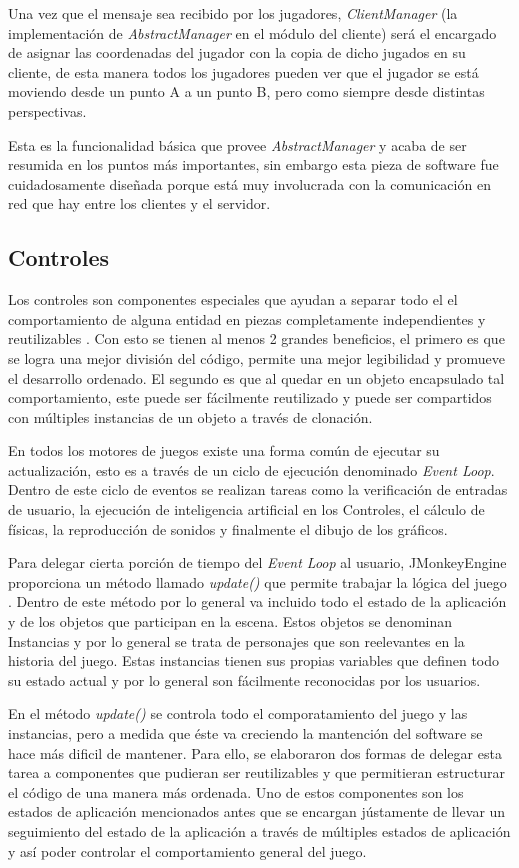 \documentclass[a4paper,12pt,openany,oneside]{book}
\begin{document}
Una vez que el mensaje sea recibido por los jugadores, \textit{ClientManager} (la implementación de \textit{AbstractManager} en el módulo del cliente) será el encargado de asignar las coordenadas del jugador con la copia de dicho jugados en su cliente, de esta manera todos los jugadores pueden ver que el jugador se está moviendo desde un punto A a un punto B, pero como siempre desde distintas perspectivas.

Esta es la funcionalidad básica que provee \textit{AbstractManager} y acaba de ser resumida en los puntos más importantes, sin embargo esta pieza de software fue cuidadosamente diseñada porque está muy involucrada con la comunicación en red que hay entre los clientes y el servidor.
\subsection{Controles}
Los controles son componentes especiales que ayudan a separar todo el el comportamiento de alguna entidad en piezas completamente independientes y reutilizables \cite{BEGINNERS}. Con esto se tienen al menos 2 grandes beneficios, el primero es que se logra una mejor división del código, permite una mejor legibilidad y promueve el desarrollo ordenado. El segundo es que al quedar en un objeto encapsulado tal comportamiento, este puede ser fácilmente reutilizado y puede ser compartidos con múltiples instancias de un objeto a través de clonación.

En todos los motores de juegos existe una forma común de ejecutar su actualización, esto es a través de un ciclo de ejecución denominado \textit{Event Loop}. Dentro de este ciclo de eventos se realizan tareas como la verificación de entradas de usuario, la ejecución de inteligencia artificial en los Controles, el cálculo de físicas, la reproducción de sonidos y finalmente el dibujo de los gráficos.

Para delegar cierta porción de tiempo del \textit{Event Loop} al usuario, JMonkeyEngine proporciona un método llamado \textit{update()} que permite trabajar la lógica del juego \cite{BEGINNERS}. Dentro de este método por lo general va incluido todo el estado de la aplicación y de los objetos que participan en la escena. Estos objetos se denominan Instancias y por lo general se trata de personajes que son reelevantes en la historia del juego. Estas instancias tienen sus propias variables que definen todo su estado actual y por lo general son fácilmente reconocidas por los usuarios. 

En el método \textit{update()} se controla todo el comporatamiento del juego y las instancias, pero a medida que éste va creciendo la mantención del software se hace más dificil de mantener. Para ello, se elaboraron dos formas de delegar esta tarea a componentes que pudieran ser reutilizables y que permitieran estructurar el código de una manera más ordenada. Uno de estos componentes son los estados de aplicación mencionados antes que se encargan jústamente de llevar un seguimiento del estado de la aplicación a través de múltiples estados de aplicación y así poder controlar el comportamiento general del juego.
\end{document}
